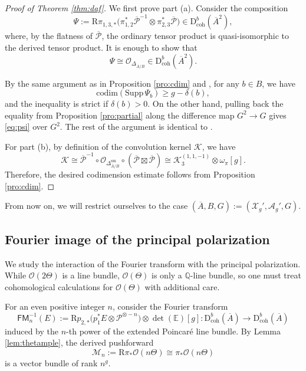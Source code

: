 \documentclass[11pt]{article}
\def\Mc{\mathcal{M}}
\def\CO{\mathcal{O}}
\def\P{\mathcal{P}}
\def\QQ{\mathbb{Q}}
\def\codim{\mathrm{codim}}
\def\dbcoh{\mathrm{D}^b_{\mathrm{coh}}}
\def\Pbar{\overline{\mathcal{P}}}
\def\FM{\mathsf{FM}}
\newcommand{\barA}{\overline{A}}
\newcommand{\K}{\mathcal{K}}
\newcommand{\supp}{\mathrm{Supp}\,}
\theoremstyle{definition}
\begin{document}
\begin{proof}[Proof of Theorem \ref{thm:daf}]
    We first prove part (a). Consider the composition
    \[
    \Psi
    :=
    \mathrm{R}\pi_{1,3,*}\bigl(\pi_{1,2}^*\Pbar^{-1} \otimes \pi_{2,3}^*\Pbar\bigr)
    \in \dbcoh(\barA^2),
    \]
    where, by the flatness of $\Pbar$, the ordinary tensor product is
    quasi-isomorphic to the derived tensor product. It is enough to show that
    \begin{equation}\label{eq:psi}
        \Psi
        \cong
        \CO_{\Delta_{\barA/B}} \in \dbcoh(\barA^2).
    \end{equation}

    By the same argument as in Proposition \ref{pro:cdim} and
    \cite[Proposition 7.6]{Arinkin2}, for any $b \in B$, we have
    \[
    \codim(\supp \Psi_b) \geq g - \delta(b),
    \]
    and the inequality is strict if $\delta(b)>0$. On the other hand, pulling
    back the equality from Proposition \ref{pro:partial} along the difference
    map $G^2 \to G$ gives \eqref{eq:psi} over $G^2$. The rest
    of the argument is identical to \cite[Proof of Proposition 7.1]{Arinkin2}.

    For part (b), by definition of the convolution kernel $\K$, we have
    \[
    \K
    \cong
    \Pbar^{-1}
    \circ
    \CO_{\Delta^{\mathrm{sm}}_{\barA/B}}
    \circ
	(\Pbar \boxtimes \Pbar) \cong \mathcal K_3^{(1,1,-1)}\otimes \omega_{\pi}[g].
    \]
    Therefore, the desired codimension estimate follows from Proposition
    \ref{pro:cdim}.
\end{proof}

From now on, we will restrict ourselves to the case $(\barA,B,G):=(\mathcal{X}_g',\mathcal{A}_g',G)$.

\subsection{Fourier image of the principal polarization}\label{sec:FMn}

We study the interaction of the Fourier transform with the principal polarization. While $\CO(2\Theta)$ is a line bundle,
$\CO(\Theta)$ is only a $\QQ$-line bundle, so one must treat cohomological calculations for $\CO(\Theta)$ with additional care.

For an even positive integer $n$, consider the Fourier transform
\[
\FM^{-1}_n(E) := \mathrm{R}p_{2,*}\bigl(p_1^*E\otimes \P^{\otimes -n}\bigr)\otimes \det(\mathbb E)[g] : \dbcoh(\barA) \to \dbcoh(\barA)
\]
induced by the $n$-th power of the extended Poincar\'e line bundle. By Lemma \ref{lem:thetample}, the derived pushforward
\begin{equation}\label{eq:defMn}
\Mc_n := \mathrm{R}\pi_*\CO(n \Theta) \cong \pi_*\CO(n\Theta)
\end{equation}
is a vector bundle of rank $n^g$.
\end{document}
